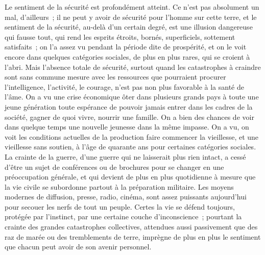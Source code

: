\documentclass[french,twoside]{book} %
\begin{document}
Le sentiment de la sécurité est profondément atteint. Ce n'est pas absolument un mal, d'ailleurs ; il ne peut y avoir de sécurité pour l'homme sur cette terre, et le sentiment de la sécurité, au-delà d'un certain degré, est une illusion dangereuse qui fausse tout, qui rend les esprits étroits, bornés, superficiels, sottement satisfaits ; on l'a assez vu pendant la période dite de prospérité, et on le voit encore dans quelques catégories sociales, de plus en plus rares, qui se croient à l'abri. Mais l'absence totale de sécurité, surtout quand les catastrophes à craindre sont sans commune mesure avec les ressources que pourraient procurer l'intelligence, l'activité, le courage, n'est pas non plus favorable à la santé de l'âme. On a vu une crise économique ôter dans plusieurs grands pays à toute une jeune génération toute espérance de pouvoir jamais entrer dans les cadres de la société, gagner de quoi vivre, nourrir une famille. On a bien des chances de voir dans quelque temps une nouvelle jeunesse dans la même impasse. On a vu, on voit les conditions actuelles de la production faire commencer la vieillesse, et une vieillesse sans soutien, à l'âge de quarante ans pour certaines catégories sociales. La crainte de la guerre, d'une guerre qui ne laisserait plus rien intact, a cessé d'être un sujet de conférences ou de brochures pour se changer en une préoccupation générale, et qui devient de plus en plus quotidienne à mesure que la vie civile se subordonne partout à la préparation militaire. Les moyens modernes de diffusion, presse, radio, cinéma, sont assez puissants aujourd'hui pour secouer les nerfs de tout un peuple. Certes la vie se défend toujours, protégée par l'instinct, par une certaine couche d'inconscience ; pourtant la crainte des grandes catastrophes collectives, attendues aussi passivement que des raz de marée ou des tremblements de terre, imprègne de plus en plus le sentiment que chacun peut avoir de son avenir personnel.\par
\end{document}
